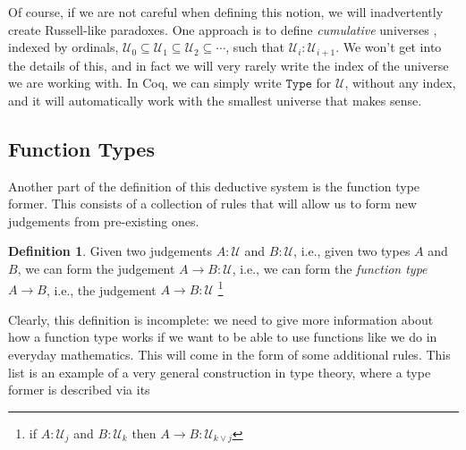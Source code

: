 \documentclass[12 pt]{amsart}
\theoremstyle{definition}
\newtheorem{definition}[subsubsection]{Definition}
\theoremstyle{remark}
\newcommand{\Type}{\mathcal{U}}
\begin{document}
Of course, if we are not careful when defining this notion, we will inadvertently create Russell-like paradoxes\cite[page 6]{enderton1977}. One approach is to define \textit{cumulative} universes \cite[Section 1.3]{hottbook}, indexed by ordinals, $\Type_0 \subseteq \Type_1 \subseteq \Type_2 \subseteq \cdots$, such that $\Type_{i} : \Type_{i+1}$. We won't get into the details of this, and in fact we will very rarely write the index of the universe we are working with. In Coq, we can simply write $\texttt{Type}$ for $\Type$, without any index, and it will automatically work with the smallest universe that makes sense.


\subsection{Function Types}

Another part of the definition of this deductive system is the function type former. This consists of a collection of rules that will allow us to form new judgements from pre-existing ones.

\begin{definition}
    Given two judgements $A : \Type$ and $B : \Type$, i.e., given two types $A$ and $B$, we can form the judgement $A\to B : \Type$, i.e., we can form the \textit{function type} $A\to B$, i.e., the judgement $A\to B : \Type$ \footnote{if $A :\Type_j$ and $B : \Type_k$ then $A\to B : \Type_{k\vee j}$}
    \label{def_fun}
\end{definition}

Clearly, this definition is incomplete: we need to give more information about how a function type works if we want to be able to use functions like we do in everyday mathematics. This will come in the form of some additional rules. This list is an example of a very general construction in type theory, where a type former is described via its
\end{document}

